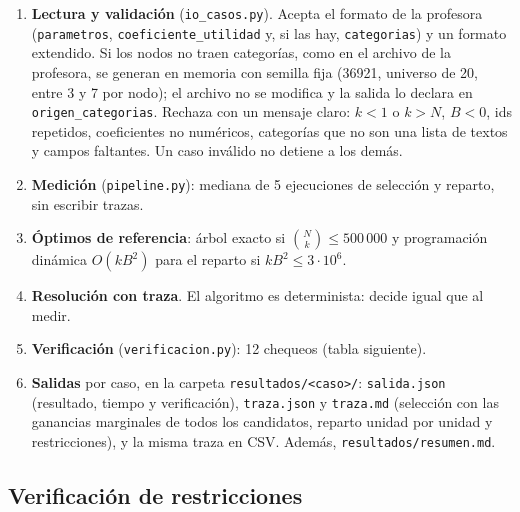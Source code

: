 \begin{enumerate}[label=\textbf{\arabic*.}]
  \item \textbf{Lectura y validación} (\texttt{io\_casos.py}). Acepta el formato de la profesora
  (\texttt{parametros}, \texttt{coeficiente\_utilidad} y, si las hay, \texttt{categorias}) y un
  formato extendido. Si los nodos no traen categorías, como en el archivo de la profesora, se
  generan en memoria con semilla fija (36921, universo de 20, entre 3 y 7 por nodo); el archivo no
  se modifica y la salida lo declara en \texttt{origen\_categorias}. Rechaza con un mensaje claro:
  $k<1$ o $k>N$, $B<0$, ids repetidos, coeficientes no numéricos, categorías que no son una lista
  de textos y campos faltantes. Un caso inválido no detiene a los demás.
  \item \textbf{Medición} (\texttt{pipeline.py}): mediana de 5 ejecuciones de selección y reparto,
  sin escribir trazas.
  \item \textbf{Óptimos de referencia}: árbol exacto si $\binom{N}{k}\le 500\,000$ y programación
  dinámica $O(kB^2)$ para el reparto si $kB^2\le3\cdot10^6$.
  \item \textbf{Resolución con traza}. El algoritmo es determinista: decide igual que al medir.
  \item \textbf{Verificación} (\texttt{verificacion.py}): 12 chequeos (tabla siguiente).
  \item \textbf{Salidas} por caso, en la carpeta \texttt{resultados/<caso>/}: \texttt{salida.json}
  (resultado, tiempo y verificación), \texttt{traza.json} y \texttt{traza.md} (selección con las
  ganancias marginales de todos los candidatos, reparto unidad por unidad y restricciones), y la
  misma traza en CSV. Además, \texttt{resultados/resumen.md}.
\end{enumerate}

\subsection{Verificación de restricciones}


